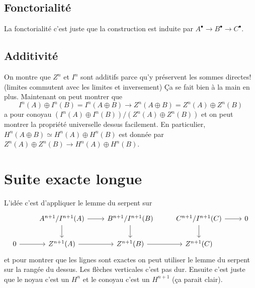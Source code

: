 \documentclass[a4paper,12pt]{book}
\theoremstyle{plain}
\theoremstyle{definition}
\theoremstyle{remark}
\begin{document}
\subsection{Fonctorialité}
La fonctorialité c'est juste que la construction est induite
par $A^\bullet\to B^\bullet\to C^\bullet$.
\subsection{Additivité}
On montre que $Z^n$ et $I^n$ sont additifs parce qu'y préservent
les sommes directes! (limites commutent avec les limites et 
inversement) Ça se fait bien à la main en plus. Maintenant on
peut montrer que
\[I^n(A)\oplus I^n(B)=I^n(A\oplus B)\to Z^n(A\oplus B)=Z^n(A)\oplus Z^n(B)\]
a pour conoyau $(I^n(A)\oplus I^n(B))/(Z^n(A)\oplus Z^n(B))$ et
on peut montrer la propriété universelle dessus facilement. En
particulier, $H^n(A\oplus B)\simeq H^n(A)\oplus H^n(B)$ est donnée
par $Z^n(A)\oplus Z^n(B)\to H^n(A)\oplus H^n(B)$.

\section{Suite exacte longue}
L'idée c'est d'appliquer le lemme du serpent sur
\[\begin{tikzcd}
	& {A^{n+1}/I^{n+1}(A)} & {B^{n+1}/I^{n+1}(B)} & {C^{n+1}/I^{n+1}(C)} & 0 \\
	0 & {Z^{n+1}(A)} & {Z^{n+1}(B)} & {Z^{n+1}(C)}
	\arrow[from=1-2, to=1-3]
	\arrow[from=1-2, to=2-2]
	\arrow[from=1-3, to=2-3]
	\arrow[from=1-4, to=1-5]
	\arrow[from=1-4, to=2-4]
	\arrow[from=2-1, to=2-2]
	\arrow[from=2-2, to=2-3]
	\arrow[from=2-3, to=2-4]
\end{tikzcd}\]
et pour montrer que les lignes sont exactes on peut utiliser le
lemme du serpent sur la rangée du dessus. Les flèches verticales
c'est pas dur. Ensuite c'est juste que le noyau c'est un $H^n$ 
et le conoyau c'est un $H^{n+1}$ (ça parait clair).
\end{document}
